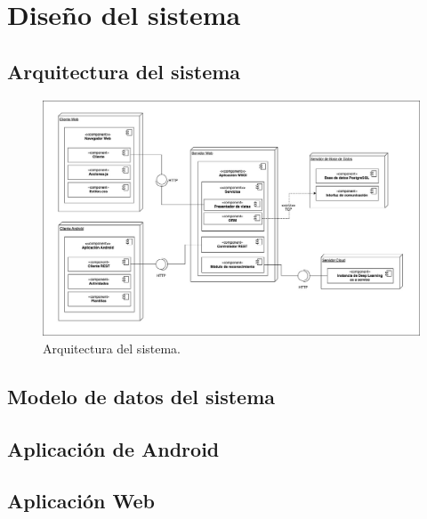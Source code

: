 \chapter{Diseño del sistema}
%



\section{Arquitectura del sistema}
\begin{figure}[h]
    \centering
    \includegraphics[width=\textwidth]{capitulo4/imagenes/ArquitecturaApp.jpg}
    \caption{Arquitectura del sistema.}
    \label{fig:arquitectura}
\end{figure}

\section{Modelo de datos del sistema}

\section{Aplicación de Android}

\newpage
\section{Aplicación Web}

\newpage

\newpage

